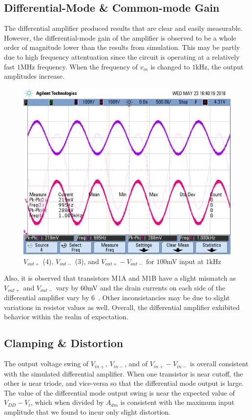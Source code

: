 \subsection{Differential-Mode \& Common-mode Gain}
The differential amplifier produced results that are clear and easily measurable.
However, the differential-mode gain of the amplifier is observed to be a whole order of magnitude lower than the results from simulation.
This may be partly due to high frequency attentuation since the circuit is operating at a relatively fast $1$\si{\mega\hertz} frequency. 
When the frequency of $v_{in}$ is changed to $1$\si{\kilo\hertz}, the output amplitudes increase.

\FloatBarrier

\begin{figure}[h!]
	\centering
	\includegraphics[scale=0.60]{./images/scope_2}
	\caption{$V_{out+}$ (4), $V_{out-}$ (3), and $V_{out+} - V_{out-}$ for $100$\si{\milli\volt} input at $1$\si{\kilo\hertz}}
	\label{fig:scope_2}
\end{figure}

\FloatBarrier

Also, it is observed that transistors M1A and M1B have a slight mismatch as $V_{out+}$ and $V_{out-}$ vary by $60$\si{\milli\volt} and the drain currents on each side of the differential amplifier vary by $6$\si{\micro\amp}.
Other inconsistancies may be due to slight variations in resistor values as well.
Overall, the differential amplifier exhibited behavior within the realm of expectation. \\



\subsection{Clamping \& Distortion}
The output voltage swing of $V_{in+}$, $V_{in-}$, and of $V_{in+} - V_{in-}$ is overall consistent with the simulated differential amplifier.
When one transistor is near cutoff, the other is near triode, and vice-versa so that the differential mode output is large.
The value of the differential mode output swing is near the expected value of $V_{DD} - V_{t}$, which when divided by $A_{dm}$ is consistent with the maximum input amplitude that we found to incur only slight distortion.